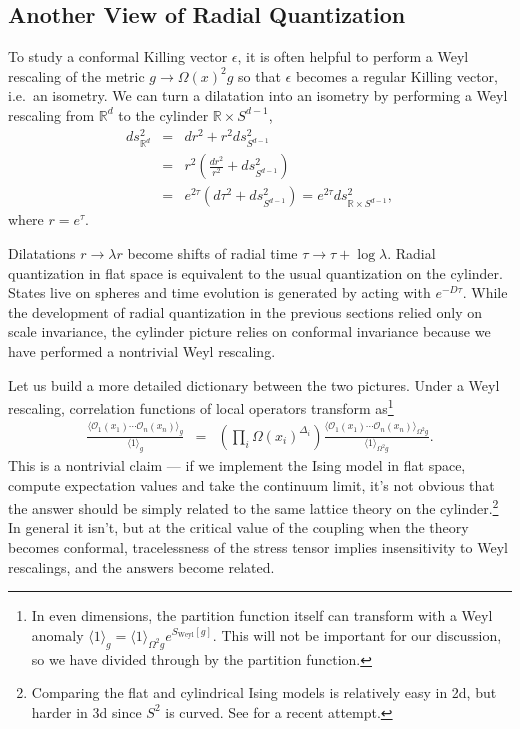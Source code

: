 \documentclass{ws-rv9x6}
\newcommand\be{\begin{eqnarray}}
\newcommand\ee{\end{eqnarray}}
\newcommand\cO{\mathcal{O}}
\newcommand\p[1]{\left(#1\right)}
\newcommand\e\epsilon
\newcommand\<\langle
\renewcommand\>\rangle
\newcommand\R{\mathbb{R}}
\newcommand\nn{\nonumber}
\renewcommand\.{\cdot}
\newcommand\x\times
\newcommand\De{\Delta}
\renewcommand\l\lambda
\begin{document}
\subsection{Another View of Radial Quantization}

To study a conformal Killing vector $\e$, it is often helpful to perform a Weyl rescaling of the metric $g\to \Omega(x)^2 g$ so that $\e$ becomes a regular Killing vector, i.e.\ an isometry.  We can turn a dilatation into an isometry by performing a Weyl rescaling from $\R^d$ to the cylinder $\R\x S^{d-1}$,
\be
ds_{\R^d}^2 &=& dr^2 + r^2 ds_{S^{d-1}}^2\nn\\
&=& r^2\p{\frac{dr^2}{r^2} + ds_{S^{d-1}}^2}\nn\\
&=& e^{2\tau}(d\tau^2 + ds_{S^{d-1}}^2) = e^{2\tau} ds_{\R\x S^{d-1}}^2,
\ee
where $r=e^\tau$.

Dilatations $r\to\l r$ become shifts of radial time $\tau\to\tau+\log \l$.  Radial quantization in flat space is equivalent to the usual quantization on the cylinder.  States live on spheres and time evolution is generated by acting with $e^{-D\tau}$.  While the development of radial quantization in the previous sections relied only on scale invariance, the cylinder picture relies on conformal invariance because we have performed a nontrivial Weyl rescaling.

Let us build a more detailed dictionary between the two pictures.  Under a Weyl rescaling, correlation functions of local operators transform as\footnote{In even dimensions, the partition function itself can transform with a Weyl anomaly $\<1\>_g=\<1\>_{\Omega^2 g}e^{S_\mathrm{Weyl}[g]}$.  This will not be important for our discussion, so we have divided through by the partition function.}
\be
\label{eq:weyltransformation}
\frac{\<\cO_1(x_1)\cdots\cO_n(x_n)\>_g}{\<1\>_g} &=& \p{\prod_i \Omega(x_i)^{\De_i}}\frac{\<\cO_1(x_1)\cdots\cO_n(x_n)\>_{\Omega^2g}}{\<1\>_{\Omega^2 g}}.
\ee
This is a nontrivial claim --- if we implement the Ising model in flat space, compute expectation values and take the continuum limit, it's not obvious that the answer should be simply related to the same lattice theory on the cylinder.\footnote{Comparing the flat and cylindrical Ising models is relatively easy in 2d, but harder in 3d since $S^2$ is curved. See \cite{Brower:2014gsa} for a recent attempt.}    In general it isn't, but at the critical value of the coupling when the theory becomes conformal, tracelessness of the stress tensor implies insensitivity to Weyl rescalings, and the answers become related.
\end{document}
